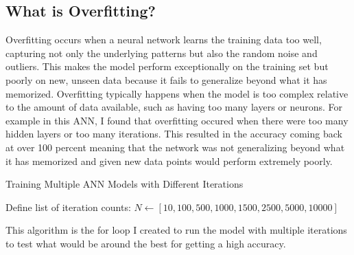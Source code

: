 \documentclass{article}
\begin{document}
\subsection{What is Overfitting?}
Overfitting occurs when a neural network learns the training data too well, capturing not only the underlying patterns but also the random noise and outliers. This makes the model perform exceptionally on the training set but poorly on new, unseen data because it fails to generalize beyond what it has memorized. Overfitting typically happens when the model is too complex relative to the amount of data available, such as having too many layers or neurons. For example in this ANN, I found that overfitting occured when there were too many hidden layers or too many iterations. This resulted in the accuracy coming back at over 100 percent meaning that the network was not generalizing beyond what it has memorized and given new data points would perform extremely poorly.


\begin{algorithm}[H]
\caption{Training Multiple ANN Models with Different Iterations}

Define list of iteration counts: $N \leftarrow [10, 100, 500, 1000, 1500, 2500, 5000, 10000]$\;
\end{algorithm}
This algorithm is the for loop I created to run the model with multiple iterations to test what would be around the best for getting a high accuracy.
\end{document}
